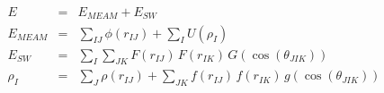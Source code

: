 \documentclass[showpacs,amsmath,amssymb,prb]{revtex4}
\begin{document}
\begin{eqnarray}
E & = & E_{MEAM} + E_{SW} \nonumber \\
E_{MEAM} & = & \sum _{IJ} \phi (r_{IJ}) + \sum _{I} U(\rho _I) \nonumber \\
E_{SW} & = & \sum _{I} \sum _{JK} F(r_{IJ}) \, F(r_{IK}) \, G(\cos(\theta _{JIK})) \nonumber \\
\rho _I & = & \sum _J \rho(r_{IJ}) + \sum _{JK} f(r_{IJ}) \, f(r_{IK}) \, g(\cos(\theta _{JIK})) \nonumber
\end{eqnarray}
\end{document}
